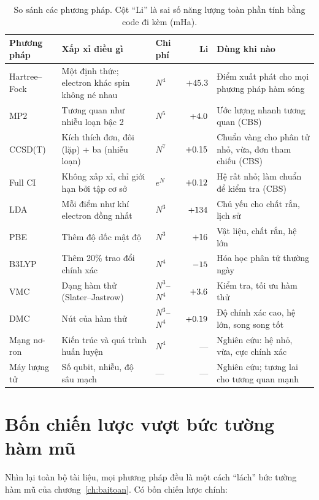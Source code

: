 \begin{table}[h]
\centering\small
\caption{So sánh các phương pháp. Cột ``Li'' là sai số năng lượng toàn phần tính bằng code đi kèm (mHa).}
\label{tab:tongket}
\begin{tabularx}{\textwidth}{@{}l>{\raggedright\arraybackslash}X>{\raggedright\arraybackslash}p{1.6cm}r>{\raggedright\arraybackslash}X@{}}
\toprule
Phương pháp & Xấp xỉ điều gì & Chi phí & Li & Dùng khi nào \\
\midrule
Hartree--Fock & Một định thức; electron khác spin không né nhau & $N^4$ & $+45.3$ & Điểm xuất phát cho mọi phương pháp hàm sóng \\
MP2 & Tương quan như nhiễu loạn bậc 2 & $N^5$ & $+4.0$ & Ước lượng nhanh tương quan (CBS) \\
CCSD(T) & Kích thích đơn, đôi (lặp) + ba (nhiễu loạn) & $N^7$ & $+0.15$ & Chuẩn vàng cho phân tử nhỏ, vừa, đơn tham chiếu (CBS) \\
Full CI & Không xấp xỉ, chỉ giới hạn bởi tập cơ sở & $e^N$ & $+0.12$ & Hệ rất nhỏ; làm chuẩn để kiểm tra (CBS) \\
LDA & Mỗi điểm như khí electron đồng nhất & $N^3$ & $+134$ & Chủ yếu cho chất rắn, lịch sử \\
PBE & Thêm độ dốc mật độ & $N^3$ & $+16$ & Vật liệu, chất rắn, hệ lớn \\
B3LYP & Thêm 20\% trao đổi chính xác & $N^4$ & $-15$ & Hóa học phân tử thường ngày \\
VMC & Dạng hàm thử (Slater--Jastrow) & $N^3$--$N^4$ & $+3.6$ & Kiểm tra, tối ưu hàm thử \\
DMC & Nút của hàm thử & $N^3$--$N^4$ & $+0.19$ & Độ chính xác cao, hệ lớn, song song tốt \\
Mạng nơ-ron & Kiến trúc và quá trình huấn luyện & $N^4$ & --- & Nghiên cứu: hệ nhỏ, vừa, cực chính xác \\
Máy lượng tử & Số qubit, nhiễu, độ sâu mạch & --- & --- & Nghiên cứu; tương lai cho tương quan mạnh \\
\bottomrule
\end{tabularx}
\end{table}

\section{Bốn chiến lược vượt bức tường hàm mũ}

Nhìn lại toàn bộ tài liệu, mọi phương pháp đều là một cách ``lách'' bức tường hàm mũ của chương~\ref{ch:baitoan}. Có bốn chiến lược chính:

